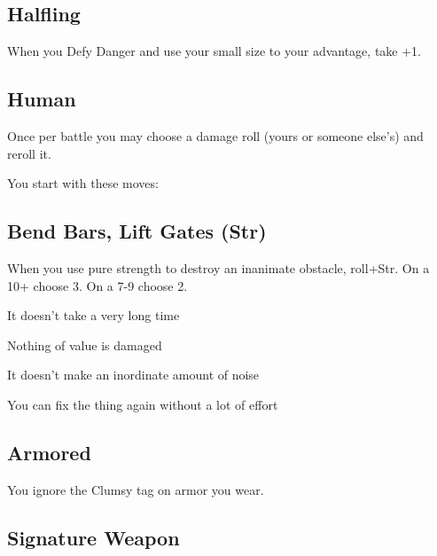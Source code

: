  
\subsection{Halfling}  
 

When you Defy Danger and use your small size to your advantage, take +1.

 
\subsection{Human}   
 

Once per battle you may choose a damage roll (yours or someone else's) and reroll it.



 


\startInstructions
You start with these moves:
\stopInstructions
 
\subsection{Bend Bars, Lift Gates (Str)}       
 

When you use pure strength to destroy an inanimate obstacle, roll+Str. On a 10+ choose 3. On a 7-9 choose 2.

 
\startitemize[1,packed]

\item It doesn’t take a very long time

 
\item Nothing of value is damaged

 
\item It doesn’t make an inordinate amount of noise

 
\item You can fix the thing again without a lot of effort


\stopitemize
 
\subsection{Armored}   
 

You ignore the Clumsy tag on armor you wear.

 
\subsection{Signature Weapon}    
 

